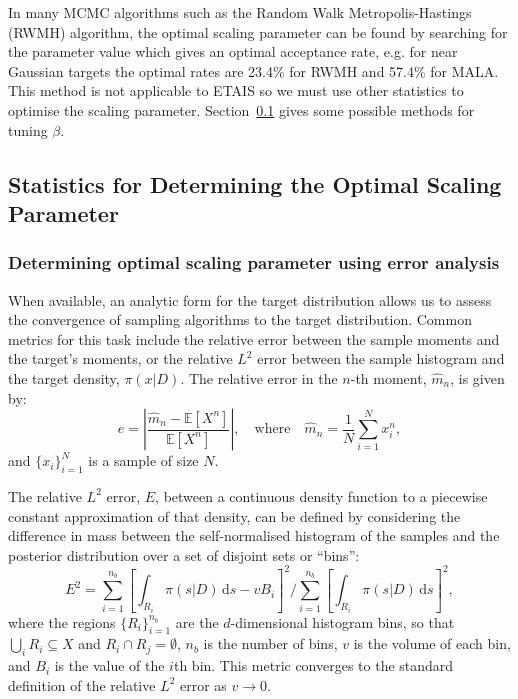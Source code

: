 \documentclass[final]{siamltex}
\begin{document}
In many MCMC algorithms such as the Random Walk Metropolis-Hastings
(RWMH) algorithm, the optimal scaling parameter can be found by
searching for the parameter value which gives an optimal acceptance
rate, e.g. for near Gaussian targets the optimal rates are 23.4\% for
RWMH and 57.4\% for MALA\cite{roberts2001optimal}. This method
is not applicable to ETAIS so we must use other statistics to optimise
the scaling parameter. Section~\ref{sec:statistics} gives some
possible methods for tuning $\beta$.





\subsection{Statistics for Determining the Optimal Scaling Parameter}\label{sec:statistics}

\subsubsection{Determining optimal scaling parameter using error analysis}

When available, an analytic form for the target distribution allows us
to assess the convergence of sampling algorithms to the target
distribution. Common metrics for this task include the relative error
between the sample moments and the target's moments, or the
relative $L^2$ error between the sample histogram and the target
density, $\pi(x|D)$. The relative error in the $n$-th moment,
$\hat{m}_n$, is given by:
\begin{equation}\label{eq:34567}
	e = \left|\frac{\hat{m}_n - \mathbb{E}[X^n]}{\mathbb{E}[X^n]}\right|, \quad \text{where} \quad \hat{m}_n = \frac{1}{N}\sum_{i=1}^N \! x_i^n,
\end{equation}
and $\{x_i\}_{i=1}^N$ is a sample of size $N$.

The relative $L^2$ error, $E$, between a continuous density function to a
piecewise constant approximation of that density, can be defined by considering the
difference in mass between the self-normalised histogram of the
samples and the posterior distribution over a set of disjoint sets or
``bins'':
\begin{equation}\label{eqn:L2_error}
	E^2 = \sum\limits_{i=1}^{n_b}\left[\displaystyle\int_{R_i} \! \pi(s|D) \, \mbox{d}s - vB_i\right]^2 \Big/ \sum\limits_{i=1}^{n_b}\left[\displaystyle\int_{R_i} \! \pi(s|D) \, \mbox{d}s\right]^2,
\end{equation}
where the regions $\{R_i\}_{i=1}^{n_b}$ are the $d$-dimensional
histogram bins, so that $\bigcup_i R_i \subseteq X$ and
$R_i\cap R_j=\emptyset$, $n_b$ is the number of bins, $v$ is the
volume of each bin, and $B_i$ is the value of the $i$th bin. This
metric converges to the standard definition of the relative $L^2$
error as $v\rightarrow 0$.
\end{document}
